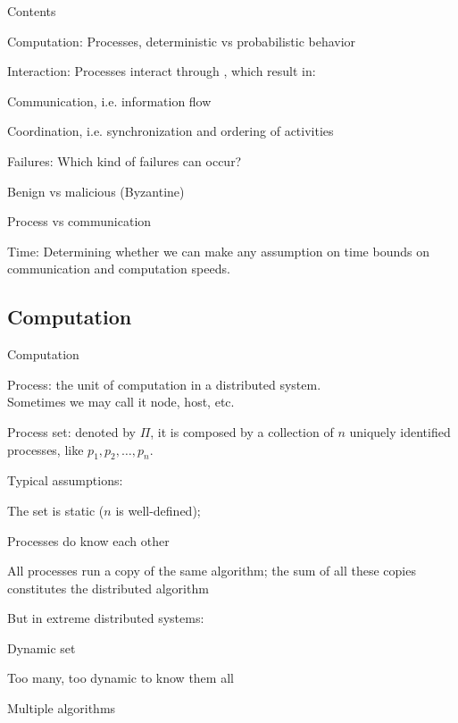 \begin{frame}{Contents}

\BIL
\item \alert{Computation}:
  Processes, deterministic vs probabilistic behavior
\item \alert{Interaction}: 
  Processes interact through , which result in:
  \BI
    \item Communication, i.e. information flow
    \item Coordination, i.e. synchronization and ordering of activities
  \EI
\item \alert{Failures}:
  Which kind of failures can occur?
  \BI 
  \item Benign vs malicious (Byzantine)
  \item Process vs communication
  \EI
\item \alert{Time}:
  Determining whether we can make any assumption on time bounds
  on communication and computation speeds.
\EIL

\end{frame}



\subsection{Computation}

\begin{frame}{Computation}

\BIL
\item \alert{Process}: the unit of computation in a distributed system.\\
Sometimes we may call it node, host, etc. 
\item \alert{Process set}: denoted by $\Pi$, it is composed by a 
collection of $n$ uniquely identified processes, like 
$p_1, p_2, \ldots, p_n$.
\item Typical assumptions:
  \BI
  \item The set is static ($n$ is well-defined);
  \item Processes do know each other
  \item All processes run a copy of the same algorithm; the sum of
    all these copies constitutes the distributed algorithm
  \EI
\item But in extreme distributed systems:
  \BI
  \item Dynamic set
  \item Too many, too dynamic to know them all
  \item Multiple algorithms
  \EI
\EIL
\end{frame}



